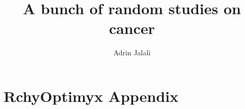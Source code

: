 \documentclass{thesis}
\title{A bunch of random studies on cancer}
\author{Adrin Jalali}
\begin{document}
\frontmatter

\maketitle
\tableofcontents


\mainmatter










\appendix
\chapter{RchyOptimyx Appendix}



\listoftables
\listoffigures



\end{document}
